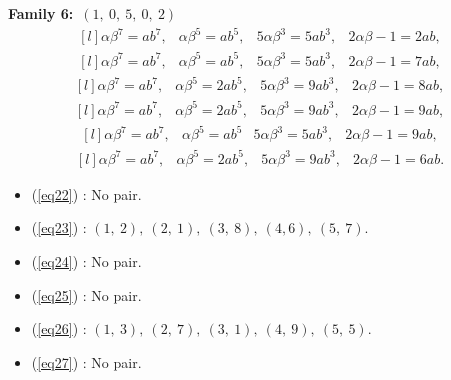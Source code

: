 \documentclass[12pt,a4wide, reqno]{amsart}
\theoremstyle{definition}
\theoremstyle{remark}
\numberwithin{equation}{section}
\begin{document}
\textbf{Family 6:}~$(1,~0,~5,~0,~2)$ 
\begin{equation}\label{eq22}
    \begin{matrix*}[l]
         \alpha \beta ^7=ab^7, & \alpha \beta ^5=ab^5, & 5\alpha \beta ^3=5ab ^3, & 2\alpha\beta-1=2ab,
    \end{matrix*}
\end{equation}
\begin{equation}\label{eq23}
    \begin{matrix*}[l]
          \alpha \beta ^7=ab^7, & \alpha \beta ^5=ab^5, & 5\alpha \beta ^3=5ab ^3, & 2\alpha\beta-1=7ab,
    \end{matrix*}
\end{equation}
\begin{equation}\label{eq24}
    \begin{matrix*}[l]
          \alpha \beta ^7=ab^7, & \alpha \beta ^5=2ab^5, & 5\alpha \beta ^3=9ab ^3, & 2\alpha\beta-1=8ab,
    \end{matrix*}
\end{equation}
\begin{equation}\label{eq25}
    \begin{matrix*}[l]
          \alpha \beta ^7=ab^7, & \alpha \beta ^5=2ab^5, & 5\alpha \beta ^3=9ab^3, & 2\alpha\beta-1=9ab,
    \end{matrix*}
\end{equation}
\begin{equation}\label{eq26}
    \begin{matrix*}[l]
          \alpha \beta ^7=ab^7, & \alpha \beta ^5=ab^5 & 5\alpha \beta ^3=5ab ^3, & 2\alpha\beta-1=9ab,
    \end{matrix*}
\end{equation}
\begin{equation}\label{eq27}
    \begin{matrix*}[l]
          \alpha \beta ^7=ab^7, & \alpha \beta ^5=2ab^5, & 5\alpha \beta ^3=9ab ^3, & 2\alpha\beta-1=6ab.
    \end{matrix*}
    \end{equation}
\begin{itemize}
    \item 
    (\ref{eq22}) : No pair.
    \item 
    (\ref{eq23}) : $(1,~2),~(2,~1),~(3,~8),~(4,6),~(5,~7).$
    \item 
    (\ref{eq24}) : No pair.
    \item 
    (\ref{eq25}) : No pair.
    \item 
    (\ref{eq26}) : $(1,~3),~(2,~7),~(3,~1),~(4,~9),~(5,~5).$
    \item
    (\ref{eq27}) : No pair.
    \end{itemize}
    
\end{document}
